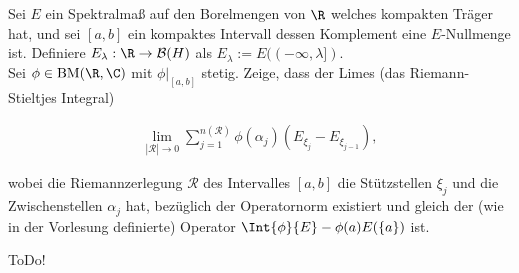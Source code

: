 \begin{exercise}[34/3]

Sei $E$ ein Spektralmaß auf den Borelmengen von $\R$ welches kompakten Träger hat, und sei $[a, b]$ ein kompaktes Intervall dessen Komplement eine $E$-Nullmenge ist.
Definiere $E_\lambda: \R \to \mathcal{B}(H)$ als $E_\lambda := E((-\infty, \lambda])$. \\

Sei $\phi \in \mathrm{BM}(\R, \C)$ mit $\phi |_{[a, b]}$ stetig.
Zeige, dass der Limes (das Riemann-Stieltjes Integral)

\begin{align*}
  \lim_{|\mathcal{R}| \to 0}
  \sum_{j=1}^{n(\mathcal{R})}
  \phi(\alpha_j)
  (E_{\xi_j} - E_{\xi_{j-1}}),
\end{align*}

wobei die Riemannzerlegung $\mathcal{R}$ des Intervalles $[a, b]$ die Stützstellen $\xi_j$ und die Zwischenstellen $\alpha_j$ hat, bezüglich der Operatornorm existiert und gleich der (wie in der Vorlesung definierte) Operator $\Int{\phi}{E} - \phi(a) E(\{a\})$ ist.

\end{exercise}

\begin{solution}

ToDo!

\end{solution}
